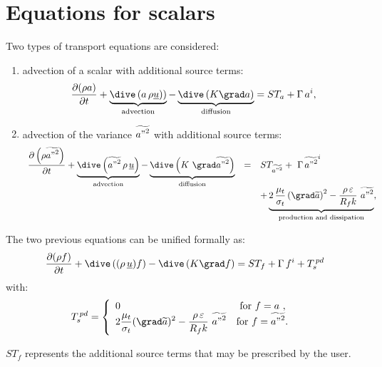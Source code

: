 \section{Equations for scalars}

Two types of transport equations are considered: 
%
\begin{enumerate}[ label=\roman{*}/, ref=(\roman{*})]
\item advection of a scalar with additional source terms:
\begin{equation}
\frac{\partial (\rho a)}{\partial t} +
\underbrace{
\dive \left( a \, \rho \underline{u})
\right)
}_{\text{advection}}
-\underbrace{
\dive \left( K\grad a \right) 
}_{
\text{diffusion}} = ST_{a}+\Gamma \,a^{i},
\end{equation}%

\item advection of the variance $\widetilde{{a"}^{2}}$ with
additional source terms:
\begin{equation}
\begin{array}{rcl}
\displaystyle\frac{\partial \left(\rho \widetilde{{a"}^{2}}\right)}{\partial t}+%
\underbrace{
\dive \left( \widetilde{{a"}^{2}} \, \rho \,\underline{u} \right)
}_{\text{advection}}
-\underbrace{
\dive \left( K\ \grad\widetilde{{a"}^{2}} \right)
}_{\text{diffusion}}
&=&ST_{\widetilde{{a"}^{2}}}+ \ \Gamma \, \widetilde{{a"}^{2}}^{i} 
\\
& &\displaystyle +
\underbrace{
2\,\frac{\mu _{t}}{\sigma _{t}} \left( \grad\widetilde{a} \right)^{2}-
\frac{\rho \,\varepsilon }{R_{f}k}\ \widetilde{{a"}^{2}}
}_{\text{production and dissipation}} ,
\end{array}%
\end{equation}%
\end{enumerate}


The two previous equations can be unified formally as:
\begin{equation}\label{eq:base_introd_depart}%
\frac{\partial (\rho f)}{\partial t}+\dive\,((\rho \,\underline{u})f)-\dive%
\,(K\grad f)=ST_{f}+\Gamma \,f^{i}+T_{s}^{\,pd}  
\end{equation}%
with:
\begin{equation}
\displaystyle T_{s}^{\,pd} = 
\left\{
\begin{array}{ll}
 0 & \text{ for $f=a$ }, \\
 2 \displaystyle \frac{\mu_t}{\sigma_t}(\grad \widetilde{a})^2 - \displaystyle
\frac{\rho\,\varepsilon}{R_f k}\ \widetilde{{a"}^2} & \text{for
$f=\widetilde{{a"}^2}$. }
\end{array}%
\right.
\end{equation}

$ST_f$ represents the additional source terms that may be prescribed by the
user.
